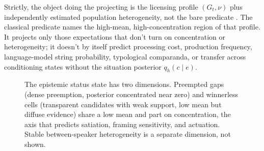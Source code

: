 Strictly, the object doing the projecting is the licensing profile
$(G_t,\nu)$ plus independently estimated population heterogeneity, not the
bare predicate . The classical predicate names the high-mean,
high-concentration region of that profile. It projects only those
expectations that don't turn on concentration or heterogeneity; it doesn't by
itself predict processing cost, production frequency, language-model string
probability, typological comparanda, or transfer across conditioning states
without the situation posterior $q_h(c\mid e)$.

\begin{figure}[t]
\centering
{}
\caption{The epistemic status state has two dimensions. Preempted gaps (dense
preemption, posterior concentrated near zero) and winnerless cells (transparent
candidates with weak support, low mean but diffuse evidence) share a low mean and part on
concentration, the axis that predicts satiation, framing sensitivity, and
actuation. Stable between-speaker heterogeneity is a separate dimension, not
shown.}
\label{fig:state-space}
\end{figure}

